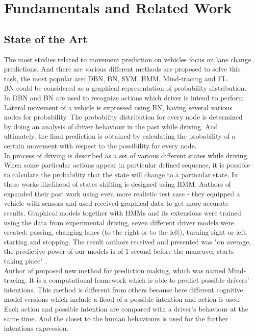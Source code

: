 \chapter{Fundamentals and Related Work}
\label{chap:1}
%
\section{State of the Art}

The most studies related to movement prediction on vehicles focus on lane change predictions. And there are various different methods are proposed to solve this task, the most popular are: \gls{DBN}, \gls{BN}, \gls{SVM}, \gls{HMM}, Mind-tracing and \gls{FL}. \\

\gls{BN} could be considered as a graphical representation of probability distribution. In \cite{BN1, BN2} \gls{DBN} and \gls{BN} are used to recognize actions which driver is intend to perform. Lateral movement of a vehicle is expressed using \gls{BN}, having several various nodes for probability. The probability distribution for every node is determined by doing an analysis of driver behaviour in the past while driving. And ultimately, the final prediction is obtained by calculating the probability of a certain movement with respect to the possibility for every node. \\

In \cite{Markov1, Markov2} process of driving is described as a set of various different states while driving. When some particular actions appear in particular defined sequence, it is possible to calculate the probability that the state will change to a particular state. In these works likelihood of states shifting is designed using \gls{HMM}. Authors of \cite{Markov3, Markov4} expanded their past work using even more realistic test case - they equipped a vehicle with sensors and used received graphical data to get more accurate results. Graphical models together with \glspl{HMM}  and its extensions were trained using the data from experimental driving,  seven different driver models were created: passing, changing lanes (to the right or to the left), turning right or left, starting and stopping. The result authors received and presented was "on average, the predictive power of our models is of 1 second before the maneuver starts taking place" \cite{Markov4}. \\

Author of \cite{Mind} proposed new method for prediction making, which was named Mind-tracing. It is a computational framework which is able to predict possible drivers' intentions. This method is different from others because here different cognitive model versions which include a flood of a possible intention and action is used. Each action and possible intention are compared with a driver's behaviour at the same time. And the closet to the human behaviours is used for the further intentions expression. \\

